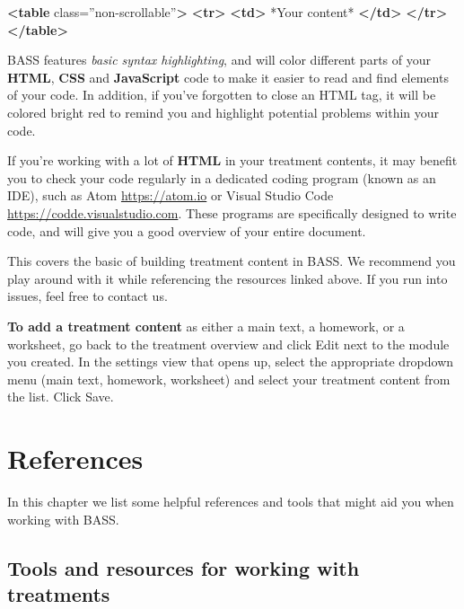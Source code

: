\documentclass[]{book}
\newenvironment{Shaded}{\begin{snugshade}}{\end{snugshade}}
\newcommand{\KeywordTok}[1]{\textcolor[rgb]{0.13,0.29,0.53}{\textbf{#1}}}
\newcommand{\NormalTok}[1]{#1}
\newcommand{\OtherTok}[1]{\textcolor[rgb]{0.56,0.35,0.01}{#1}}
\newcommand{\StringTok}[1]{\textcolor[rgb]{0.31,0.60,0.02}{#1}}
\begin{document}
\begin{Shaded}
\begin{Highlighting}[]
\KeywordTok{<table}\OtherTok{ class=}\StringTok{”non-scrollable”}\KeywordTok{>}
  \KeywordTok{<tr>}
    \KeywordTok{<td>}
\NormalTok{      *Your content*}
    \KeywordTok{</td>}
  \KeywordTok{</tr>}
\KeywordTok{</table>}
\end{Highlighting}
\end{Shaded}

BASS features \emph{basic syntax highlighting}, and will color different parts of your \textbf{HTML}, \textbf{CSS} and \textbf{JavaScript} code to make it easier to read and find elements of your code. In addition, if you've forgotten to close an HTML tag, it will be colored bright red to remind you and highlight potential problems within your code.

If you're working with a lot of \textbf{HTML} in your treatment contents, it may benefit you to check your code regularly in a dedicated coding program (known as an IDE), such as Atom \url{https://atom.io} or Visual Studio Code \href{https://code.visualstudio.com}{https://codde.visualstudio.com}. These programs are specifically designed to write code, and will give you a good overview of your entire document.

This covers the basic of building treatment content in BASS. We recommend you play around with it while referencing the resources linked above. If you run into issues, feel free to contact us.

\textbf{To add a treatment content} as either a main text, a homework, or a worksheet, go back to the treatment overview and click Edit next to the module you created. In the settings view that opens up, select the appropriate dropdown menu (main text, homework, worksheet) and select your treatment content from the list. Click Save.

\hypertarget{references}{%
\chapter{References}\label{references}}

In this chapter we list some helpful references and tools that might aid you when working with BASS.

\hypertarget{tools-and-resources-for-working-with-treatments}{%
\section{Tools and resources for working with treatments}\label{tools-and-resources-for-working-with-treatments}}
\end{document}
